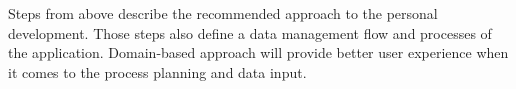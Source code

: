Steps from above describe the recommended approach to the personal development.
Those steps also define a data management flow and processes of the application.
Domain-based approach will provide better user experience when it comes to the process planning and data input.
